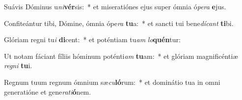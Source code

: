 \item Suávis Dóminus u\textit{ni}\textbf{vér}sis:~* et miseratiónes ejus super ómnia ó\textit{pe}\textit{ra} \textbf{e}jus.
\item Confiteántur tibi, Dómine, ómnia ópe\textit{ra} \textbf{tu}a:~* et sancti tui bene\textit{dí}\textit{cant} \textbf{ti}bi.
\item Glóriam regni tu\textit{i} \textbf{di}cent:~* et poténtiam tu\textit{am} \textit{lo}\textbf{quén}tur:
\item Ut notam fáciant fíliis hóminum poténti\textit{am} \textbf{tu}am:~* et glóriam magnificéntiæ \textit{re}\textit{gni} \textbf{tu}i.
\item Regnum tuum regnum ómnium sæ\textit{cu}\textbf{ló}rum:~* et dominátio tua in omni generatióne et gene\textit{ra}\textit{ti}\textbf{ó}nem.
